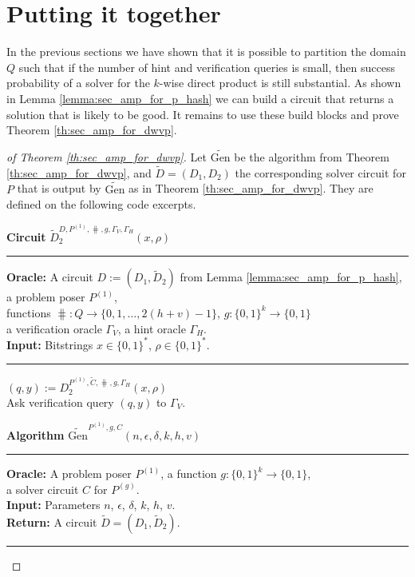 %
\section{Putting it together}
\label{st:put_together}
In the previous sections we have shown that it is possible to partition the domain $Q$ such that
if the number of hint and verification queries is small, then success probability
of a solver for the $k$-wise direct product is still substantial.
As shown in Lemma \ref{lemma:sec_amp_for_p_hash} we can build a circuit that returns a solution that is likely to be good.
It remains to use these build blocks and prove Theorem \ref{th:sec_amp_for_dwvp}.

\begin{proof}[of Theorem \ref{th:sec_amp_for_dwvp}]
Let $\widetilde{\text{Gen}}$ be the algorithm from Theorem \ref{th:sec_amp_for_dwvp}, and
$\widetilde{D} = (D_1, D_2)$ the corresponding solver circuit for $P$ that is output by $\widetilde{\text{Gen}}$
as in Theorem \ref{th:sec_amp_for_dwvp}. They are defined on the following code excerpts.
%
\begin{codeblock}
  \textbf{Circuit} $\widetilde{D}_2^{D, P^{(1)}, \hash, g, \Gamma_V, \Gamma_H}(x, \rho)$
  \medskip \hrule
  \textbf{Oracle:} A circuit $D :=(D_1, \widetilde{D}_2)$ from Lemma \ref{lemma:sec_amp_for_p_hash}, a problem poser $P^{(1)}$, \\
  \IndII functions $\hash: Q \rightarrow \{0,1, \dots, 2(h+v) - 1\}$, $g: \{0,1\}^{k} \rightarrow \{0,1\}$ \\
  \IndII a verification oracle $\Gamma_V$, a hint oracle $\Gamma_H$.\\
  \textbf{Input:}  Bitstrings $x \in \{0,1\}^{*}$, $\rho \in \{0,1\}^{*}$.
  \medskip\hrule
  $(q, y) := D_2^{P^{(1)}, \widetilde{C}, \hash, g, \Gamma_H}(x, \rho)$ \\
  Ask verification query $(q,y)$ to $\Gamma_V$.
\end{codeblock}
%
\begin{codeblock}
  \textbf{Algorithm} $\widetilde{\text{Gen}}^{P^{(1)}, g, C}(n, \epsilon, \delta, k, h, v)$
  \medskip\hrule
  \textbf{Oracle:} A problem poser $P^{(1)}$, a function $g: \{0,1\}^{k} \rightarrow \{0,1\}$, \\
  \IndII a solver circuit $C$ for $P^{(g)}$.  \\
  \textbf{Input:} Parameters $n$, $\epsilon$, $\delta$, $k$, $h$, $v$.\\
  \textbf{Return:} A circuit $\widetilde{D} = (D_1, \widetilde{D}_2)$.
  \medskip\hrule

\end{codeblock}
\end{proof}
